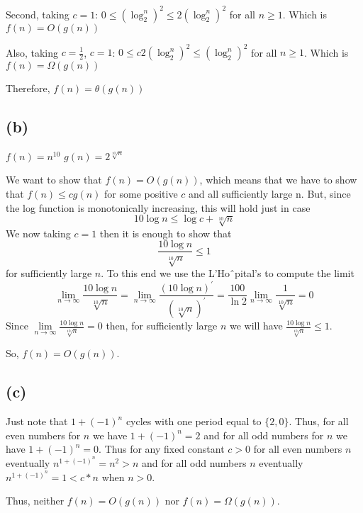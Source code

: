 \documentclass[a4paper]{article}
\begin{document}
	Second, taking $c = 1$: $0 \leq (\log_2^n)^2 \leq 2(\log_2^n)^2$ for all $n \geq 1$. Which is $f(n) = O(g(n))$
	
	Also, taking $c=\frac{1}{2}$, $c = 1$: $0 \leq c2(\log_2^n)^2 \leq (\log_2^n)^2$ for all $n \geq 1$. Which is $f(n) = \Omega (g(n))$

	Therefore, $f(n) = \theta(g(n))$
	\subsection*{(b)}
	$f(n) = n^{10}$ \quad\quad\quad $g(n) = 2^{\sqrt[10]{n}}$
	
	We want to show that $f(n)=O(g(n))$, which means that we have to show that $f(n) \leq cg(n)$ for some positive $c$ and all sufficiently large n. But, since the log function is monotonically increasing, this will hold just in case
	\[10\log n \leq \log c + \sqrt[10]{n}\]
	We now taking $c=1$ then it is enough to show that 
	\[\frac{10\log n}{\sqrt[10]{n}} \leq 1\]  
	for sufficiently large $n$. To this end we use the L’Hoˆpital’s to compute the limit
	\[\lim\limits_{n \to \infty}\frac{10\log n}{\sqrt[10]{n}} =
	 \lim\limits_{n \to \infty}\frac{(10\log n)^{'}}{(\sqrt[10]{n})^{'}}=
	 \frac{100}{\ln 2}\lim\limits_{n \to \infty}\frac{1}{\sqrt[10]{n}} = 0
	 \]
	 Since $\lim\limits_{n \to \infty}\frac{10\log n}{\sqrt[10]{n}} = 0$ then, for sufficiently large $n$ we will have $\frac{10\log n}{\sqrt[10]{n}} \leq 1 $.
	 
	 So, $f(n) = O(g(n))$.

	
	
	\subsection*{(c)} 
	Just note that $1+(-1)^n$ cycles with one period equal to $\{2,0\}$. Thus, for all even numbers for $n$ we have $1+(-1)^n=2$ and for all odd numbers for $n$ we have $1+(-1)^n=0$. Thus for any fixed constant $c>0$ for all even numbers $n$ eventually $n^{1+(-1)^n} = n^2 > n$ and for all odd numbers $n$ eventually $n^{1+(-1)^n} = 1 < c*n$ when $n > 0$.
	
	Thus, neither $f(n)=O(g(n))$ nor $f(n)=\Omega(g(n))$.
\end{document}
